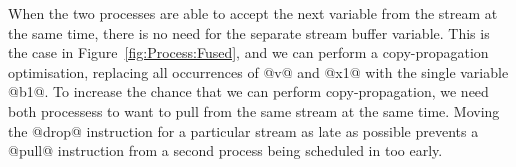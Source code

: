 
When the two processes are able to accept the next variable from the stream at the same time, there is no need for the separate stream buffer variable. This is the case in Figure~\ref{fig:Process:Fused}, and we can perform a copy-propagation optimisation, replacing all occurrences of @v@ and @x1@ with the single variable @b1@. To increase the chance that we can perform copy-propagation, we need both processess to want to pull from the same stream at the same time. Moving the @drop@ instruction for a particular stream as late as possible prevents a @pull@ instruction from a second process being scheduled in too early.



